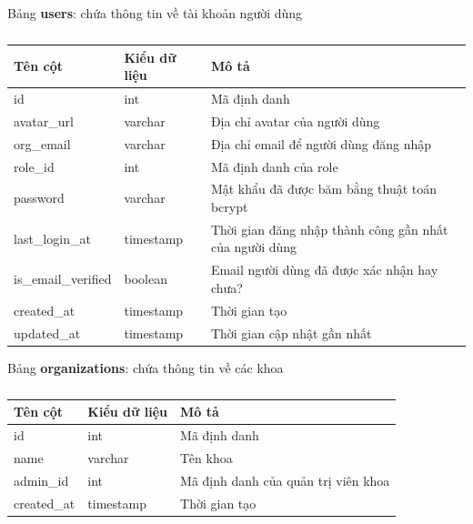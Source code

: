 \documentclass[./../main.tex]{subfiles}
\begin{document}
Bảng \textbf{users}: chứa thông tin về tài khoản người dùng

\begin{table}[H]
	\caption{}
	\label{tab:db_users}
	\begin{tabularx}{\textwidth}{|l|l|X|}
	\hline
	\textbf{Tên cột}    & \textbf{Kiểu dữ liệu} & \textbf{Mô tả}                                         \\ \hline
	id                  & int                   & Mã định danh                                           \\ \hline
	avatar\_url         & varchar               & Địa chỉ avatar của người dùng                          \\ \hline
	org\_email          & varchar               & Địa chỉ email để người dùng đăng nhập                  \\ \hline
	role\_id            & int                   & Mã định danh của role                                  \\ \hline
	password            & varchar               & Mật khẩu đã được băm bằng thuật toán bcrypt            \\ \hline
	last\_login\_at     & timestamp             & Thời gian đăng nhập thành công gần nhất của người dùng \\ \hline
	is\_email\_verified & boolean               & Email người dùng đã được xác nhận hay chưa?            \\ \hline
	created\_at         & timestamp             & Thời gian tạo                                          \\ \hline
	updated\_at         & timestamp             & Thời gian cập nhật gần nhất                            \\ \hline
	\end{tabularx}
\end{table}

Bảng \textbf{organizations}: chứa thông tin về các khoa

\begin{table}[H]
	\caption{}
	\label{tab:db_organizations}
	\begin{tabular}{|l|l|l|}
	\hline
	\textbf{Tên cột} & \textbf{Kiểu dữ liệu} & \textbf{Mô tả}                      \\ \hline
	id               & int                   & Mã định danh                        \\ \hline
	name             & varchar               & Tên khoa                            \\ \hline
	admin\_id        & int                   & Mã định danh của quản trị viên khoa \\ \hline
	created\_at      & timestamp             & Thời gian tạo                       \\ \hline
	\end{tabular}
\end{table}
\end{document}
